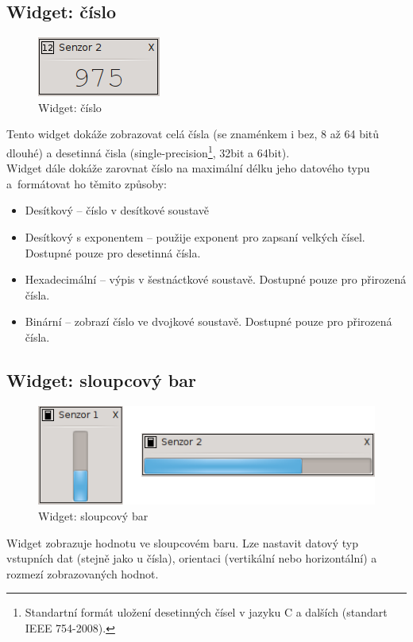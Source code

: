 \documentclass[12pt, a4paper, oneside]{article}
\begin{document}
\subsection{Widget: číslo}
\begin{figure}[h]
\begin{center}
\includegraphics{img/w_num.png}
\caption{Widget: číslo}
\end{center}
\end{figure}
Tento widget dokáže zobrazovat celá čísla (se znaménkem i bez, 8 až 64 bitů dlouhé) a desetinná čisla (single-precision\footnote{Standartní formát uložení desetinných čísel v jazyku C a dalších (standart IEEE 754-2008).}, 32bit a 64bit).\\
Widget dále dokáže zarovnat číslo na maximální délku jeho datového typu\\a~formátovat ho těmito způsoby:
\begin{itemize}
    \item Desítkový -- číslo v desítkové soustavě
    \item Desítkový s exponentem -- použije exponent pro zapsaní velkých čísel. Dostupné pouze pro desetinná čísla.
    \item Hexadecimální -- výpis v šestnáctkové soustavě. Dostupné pouze pro přirozená čísla. 
    \item Binární -- zobrazí číslo ve dvojkové soustavě.  Dostupné pouze pro přirozená čísla.
\end{itemize}


\subsection{Widget: sloupcový bar}
\begin{figure}[H]
\begin{center}
\includegraphics{img/w_bar.png}
\caption{Widget: sloupcový bar}
\end{center}
\end{figure}
Widget zobrazuje hodnotu ve sloupcovém baru. Lze nastavit datový typ vstupních dat (stejně jako u čísla), orientaci (vertikální nebo horizontální) a rozmezí zobrazovaných hodnot.
\end{document}

